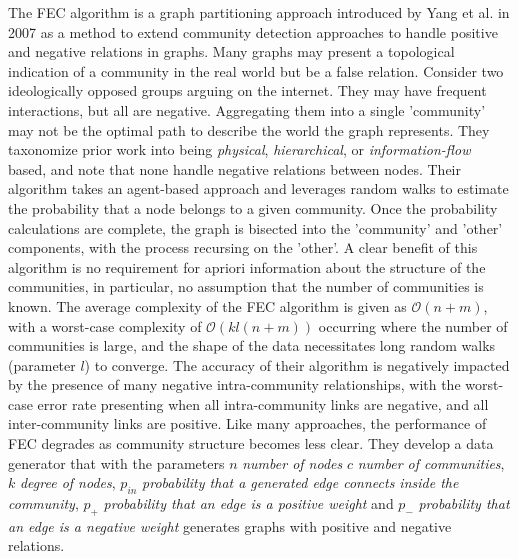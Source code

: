 \par{The FEC algorithm is a graph partitioning approach introduced by Yang et al. in 2007 as a method to extend community detection approaches to handle positive and negative relations in graphs. 
Many graphs may present a topological indication of a community in the real world but be a false relation.
 Consider two ideologically opposed groups arguing on the internet. 
 They may have frequent interactions, but all are negative. 
 Aggregating them into a single 'community' may not be the optimal path to describe the world the graph represents. 
 They taxonomize prior work into being \textit{physical}, \textit{hierarchical}, or \textit{information-flow} based, and note that none handle negative relations between nodes. 
 Their algorithm takes an agent-based approach and leverages random walks to estimate the probability that a node belongs to a given community. 
 Once the probability calculations are complete, the graph is bisected into the 'community' and 'other' components, with the process recursing on the 'other'. 
 A clear benefit of this algorithm is no requirement for apriori information about the structure of the communities, in particular, no assumption that the number of communities is known. 
 The average complexity of the FEC algorithm is given as $\mathcal{O}(n+m)$, with a worst-case complexity of $\mathcal{O}(kl(n+m))$ occurring where the number of communities is large, and the shape of the data necessitates long random walks (parameter $l$) to converge. 
 The accuracy of their algorithm is negatively impacted by the presence of many negative intra-community relationships, with the worst-case error rate presenting when all intra-community links are negative, and all inter-community links are positive. 
 Like many approaches, the performance of FEC degrades as community structure becomes less clear. 
 They develop a data generator that with the parameters $n$ \textit{number of nodes} $c$ \textit{number of communities}, $k$ \textit{degree of nodes}, $p_{in}$ \textit{probability that a generated edge connects inside the community}, $p_+$ \textit{probability that an edge is a positive weight} and $p_-$ \textit{probability that an edge is a negative weight} generates graphs with positive and negative relations\cite{Yang2007}.}

